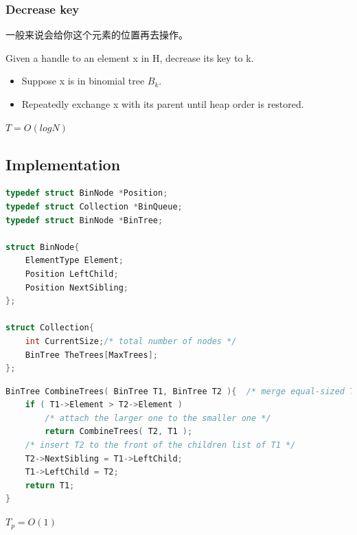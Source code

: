 \documentclass{article}
\begin{document}
\subsubsection{Decrease key}
一般来说会给你这个元素的位置再去操作。\par
Given a handle to an element x in H, decrease its key to k.\par
\begin{itemize}
    \item Suppose x is in binomial tree $B_k$.
    \item Repeatedly exchange x with its parent until heap order is restored.
\end{itemize}
\par
$T = O(log N)$

\subsection{Implementation}
\begin{lstlisting}[language={c},title={Binomial Queue}]
typedef struct BinNode *Position;
typedef struct Collection *BinQueue;
typedef struct BinNode *BinTree;

struct BinNode{
    ElementType Element;
    Position LeftChild;
    Position NextSibling;
};

struct Collection{
    int CurrentSize;/* total number of nodes */
    BinTree TheTrees[MaxTrees];
};
\end{lstlisting}

\begin{lstlisting}[language={c},title={CombineTrees}]
BinTree CombineTrees( BinTree T1, BinTree T2 ){  /* merge equal-sized T1 and T2 */
    if ( T1->Element > T2->Element )
        /* attach the larger one to the smaller one */
        return CombineTrees( T2, T1 );
    /* insert T2 to the front of the children list of T1 */
    T2->NextSibling = T1->LeftChild;
    T1->LeftChild = T2;
    return T1;
}
\end{lstlisting}

$T_p = O(1)$

\hspace*{\fill}\par\hspace*{\fill}\par
\end{document}
